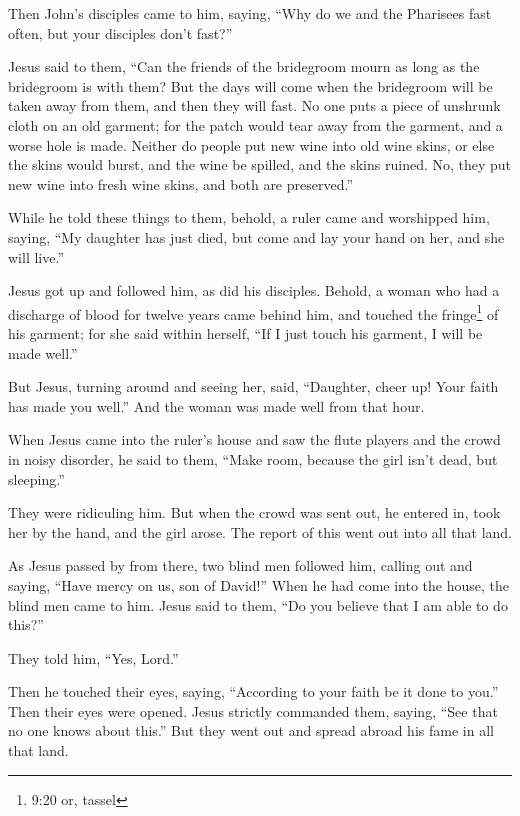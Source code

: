  Then John's disciples came to him, saying, ``Why do we and
the Pharisees fast often, but your disciples don't fast?''

 Jesus said to them, ``Can the friends of the bridegroom
mourn as long as the bridegroom is with them? But the days will come
when the bridegroom will be taken away from them, and then they will
fast.  No one puts a piece of unshrunk cloth on an old
garment; for the patch would tear away from the garment, and a worse
hole is made.  Neither do people put new wine into old wine
skins, or else the skins would burst, and the wine be spilled, and the
skins ruined. No, they put new wine into fresh wine skins, and both are
preserved.''

 While he told these things to them, behold, a ruler came
and worshipped him, saying, ``My daughter has just died, but come and
lay your hand on her, and she will live.''

 Jesus got up and followed him, as did his disciples.
 Behold, a woman who had a discharge of blood for twelve
years came behind him, and touched the fringe\footnote{9:20 or, tassel}
of his garment;  for she said within herself, ``If I just
touch his garment, I will be made well.''

 But Jesus, turning around and seeing her, said,
``Daughter, cheer up! Your faith has made you well.'' And the woman was
made well from that hour.

 When Jesus came into the ruler's house and saw the flute
players and the crowd in noisy disorder,  he said to them,
``Make room, because the girl isn't dead, but sleeping.''

They were ridiculing him.  But when the crowd was sent out,
he entered in, took her by the hand, and the girl arose. 
The report of this went out into all that land.

 As Jesus passed by from there, two blind men followed him,
calling out and saying, ``Have mercy on us, son of David!''
 When he had come into the house, the blind men came to
him. Jesus said to them, ``Do you believe that I am able to do this?''

They told him, ``Yes, Lord.''

 Then he touched their eyes, saying, ``According to your
faith be it done to you.''  Then their eyes were opened.
Jesus strictly commanded them, saying, ``See that no one knows about
this.''  But they went out and spread abroad his fame in
all that land.

